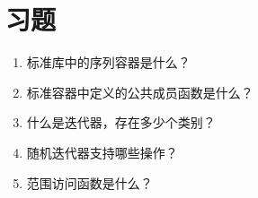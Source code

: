 \section{习题}
\begin{enumerate}
  \item 标准库中的序列容器是什么？
  \item 标准容器中定义的公共成员函数是什么？
  \item 什么是迭代器，存在多少个类别？
  \item 随机迭代器支持哪些操作？
  \item 范围访问函数是什么？
\end{enumerate}